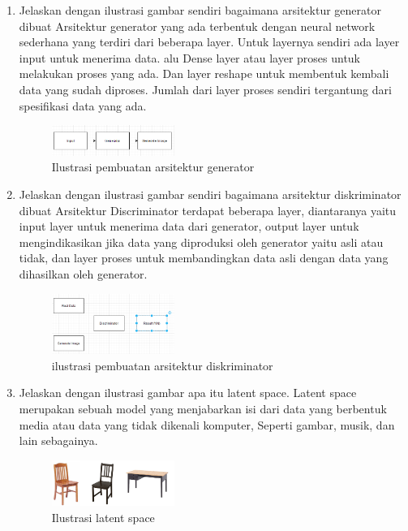 \begin{enumerate}
	\item Jelaskan dengan ilustrasi gambar sendiri bagaimana arsitektur generator dibuat
	\hfill\break
	Arsitektur generator yang ada terbentuk dengan neural network sederhana yang terdiri dari beberapa layer. Untuk layernya sendiri ada layer input untuk menerima data. alu Dense layer atau layer proses untuk melakukan proses yang ada. Dan layer reshape untuk membentuk kembali data yang sudah diproses. Jumlah dari layer proses sendiri tergantung dari spesiﬁkasi data yang ada.
    \begin{figure}[H]
        \centering
            \includegraphics[width=4cm]{figures/1174096/tugas8/t3.PNG}
            \caption{Ilustrasi pembuatan arsitektur generator}
        \end{figure}

	\item Jelaskan dengan ilustrasi gambar sendiri bagaimana arsitektur diskriminator dibuat
	\hfill\break
	Arsitektur Discriminator terdapat beberapa layer, diantaranya yaitu input layer untuk menerima data dari generator, output layer untuk mengindikasikan jika data yang diproduksi oleh generator yaitu asli atau tidak, dan layer proses untuk membandingkan data asli dengan data yang dihasilkan oleh generator.
    \begin{figure}[H]
	\centering
		\includegraphics[width=4cm]{figures/1174096/tugas8/t4.PNG}
		\caption{ilustrasi pembuatan arsitektur diskriminator}
	\end{figure}

	\item Jelaskan dengan ilustrasi gambar apa itu latent space.
	\hfill\break
	Latent space merupakan sebuah model yang menjabarkan isi dari data yang berbentuk media atau data yang tidak dikenali komputer, Seperti gambar, musik, dan lain sebagainya.
	\begin{figure}[H]
	\centering
		\includegraphics[width=4cm]{figures/1174096/tugas8/t5.PNG}
		\caption{Ilustrasi latent space}
	\end{figure}


\end{enumerate}
